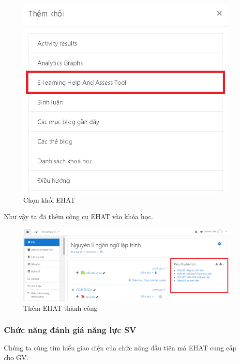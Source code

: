 \begin{center}
	\begin{figure}[htp]
		\begin{center}
			\includegraphics[width=0.6\linewidth]{img/37}
		\end{center}
		\caption{Chọn khối EHAT}
		\label{refhinh45}
	\end{figure}
\end{center}

Như vậy ta đã thêm công cụ EHAT vào khóa học.

\begin{center}
	\begin{figure}[htp]
		\begin{center}
			\includegraphics[width=1\linewidth]{img/39}
		\end{center}
		\caption{Thêm EHAT thành công}
		\label{refhinh47}
	\end{figure}
\end{center}

\newpage
\subsubsection{Chức năng đánh giá năng lực SV}

Chúng ta cùng tìm hiểu giao diện của chức năng đầu tiên mà EHAT cung cấp cho GV.


